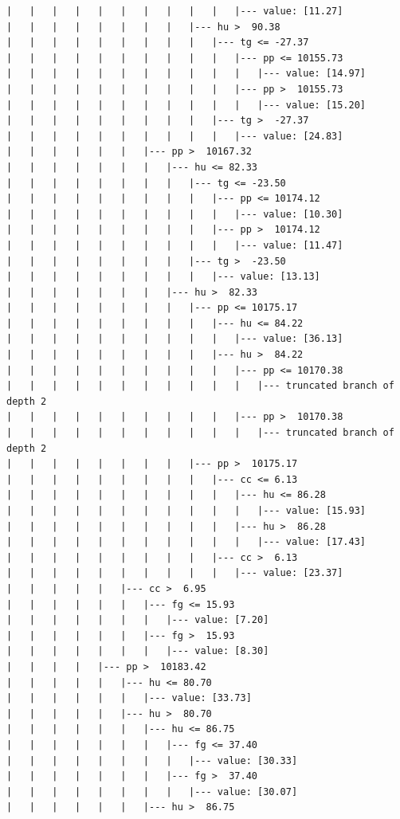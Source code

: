 \documentclass[UTF8, a4paper]{ctexart}
\begin{document}
\begin{lstlisting}
|   |   |   |   |   |   |   |   |   |   |--- value: [11.27]
|   |   |   |   |   |   |   |   |--- hu >  90.38
|   |   |   |   |   |   |   |   |   |--- tg <= -27.37
|   |   |   |   |   |   |   |   |   |   |--- pp <= 10155.73
|   |   |   |   |   |   |   |   |   |   |   |--- value: [14.97]
|   |   |   |   |   |   |   |   |   |   |--- pp >  10155.73
|   |   |   |   |   |   |   |   |   |   |   |--- value: [15.20]
|   |   |   |   |   |   |   |   |   |--- tg >  -27.37
|   |   |   |   |   |   |   |   |   |   |--- value: [24.83]
|   |   |   |   |   |   |--- pp >  10167.32
|   |   |   |   |   |   |   |--- hu <= 82.33
|   |   |   |   |   |   |   |   |--- tg <= -23.50
|   |   |   |   |   |   |   |   |   |--- pp <= 10174.12
|   |   |   |   |   |   |   |   |   |   |--- value: [10.30]
|   |   |   |   |   |   |   |   |   |--- pp >  10174.12
|   |   |   |   |   |   |   |   |   |   |--- value: [11.47]
|   |   |   |   |   |   |   |   |--- tg >  -23.50
|   |   |   |   |   |   |   |   |   |--- value: [13.13]
|   |   |   |   |   |   |   |--- hu >  82.33
|   |   |   |   |   |   |   |   |--- pp <= 10175.17
|   |   |   |   |   |   |   |   |   |--- hu <= 84.22
|   |   |   |   |   |   |   |   |   |   |--- value: [36.13]
|   |   |   |   |   |   |   |   |   |--- hu >  84.22
|   |   |   |   |   |   |   |   |   |   |--- pp <= 10170.38
|   |   |   |   |   |   |   |   |   |   |   |--- truncated branch of depth 2
|   |   |   |   |   |   |   |   |   |   |--- pp >  10170.38
|   |   |   |   |   |   |   |   |   |   |   |--- truncated branch of depth 2
|   |   |   |   |   |   |   |   |--- pp >  10175.17
|   |   |   |   |   |   |   |   |   |--- cc <= 6.13
|   |   |   |   |   |   |   |   |   |   |--- hu <= 86.28
|   |   |   |   |   |   |   |   |   |   |   |--- value: [15.93]
|   |   |   |   |   |   |   |   |   |   |--- hu >  86.28
|   |   |   |   |   |   |   |   |   |   |   |--- value: [17.43]
|   |   |   |   |   |   |   |   |   |--- cc >  6.13
|   |   |   |   |   |   |   |   |   |   |--- value: [23.37]
|   |   |   |   |   |--- cc >  6.95
|   |   |   |   |   |   |--- fg <= 15.93
|   |   |   |   |   |   |   |--- value: [7.20]
|   |   |   |   |   |   |--- fg >  15.93
|   |   |   |   |   |   |   |--- value: [8.30]
|   |   |   |   |--- pp >  10183.42
|   |   |   |   |   |--- hu <= 80.70
|   |   |   |   |   |   |--- value: [33.73]
|   |   |   |   |   |--- hu >  80.70
|   |   |   |   |   |   |--- hu <= 86.75
|   |   |   |   |   |   |   |--- fg <= 37.40
|   |   |   |   |   |   |   |   |--- value: [30.33]
|   |   |   |   |   |   |   |--- fg >  37.40
|   |   |   |   |   |   |   |   |--- value: [30.07]
|   |   |   |   |   |   |--- hu >  86.75

\end{lstlisting}
\end{document}
